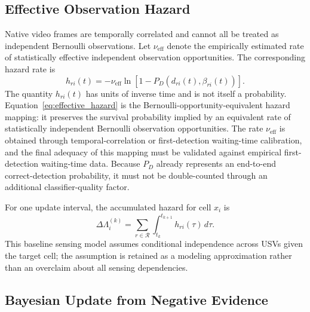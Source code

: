 \documentclass[letterpaper, 10pt, conference]{ieeeconf}
\begin{document}
\subsection{Effective Observation Hazard}

Native video frames are temporally correlated and cannot all be treated as independent Bernoulli observations. Let \(\nu_{\mathrm{eff}}\) denote the empirically estimated rate of statistically effective independent observation opportunities. The corresponding hazard rate is
\begin{equation}
  h_{ri}(t) = -\nu_{\mathrm{eff}}\ln\!\left[1-P_D\!\left(d_{ri}(t),\beta_{ri}(t)\right)\right].
  \label{eq:effective_hazard}
\end{equation}
The quantity \(h_{ri}(t)\) has units of inverse time and is not itself a probability. Equation~\eqref{eq:effective_hazard} is the Bernoulli-opportunity-equivalent hazard mapping: it preserves the survival probability implied by an equivalent rate of statistically independent Bernoulli observation opportunities. The rate \(\nu_{\mathrm{eff}}\) is obtained through temporal-correlation or first-detection waiting-time calibration, and the final adequacy of this mapping must be validated against empirical first-detection waiting-time data. Because \(P_D\) already represents an end-to-end correct-detection probability, it must not be double-counted through an additional classifier-quality factor.

For one update interval, the accumulated hazard for cell \(x_i\) is
\begin{equation}
  \Delta\Lambda_i^{(k)} =
  \sum_{r\in\mathcal{R}}\int_{t_k}^{t_{k+1}} h_{ri}(\tau)\,d\tau.
  \label{eq:interval_hazard}
\end{equation}
This baseline sensing model assumes conditional independence across USVs given the target cell; the assumption is retained as a modeling approximation rather than an overclaim about all sensing dependencies.

\subsection{Bayesian Update from Negative Evidence}
\end{document}

